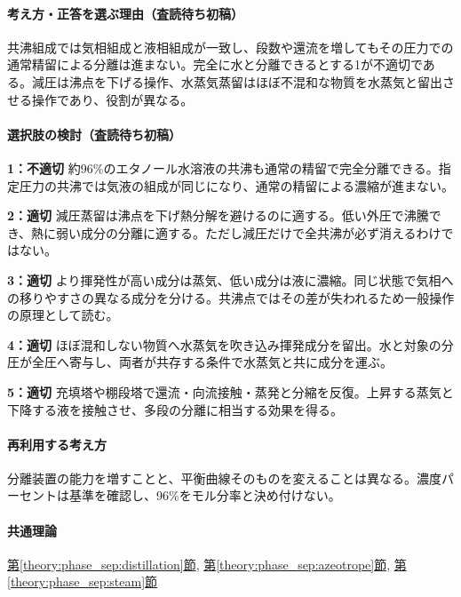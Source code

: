 \paragraph{考え方・正答を選ぶ理由（査読待ち初稿）} 共沸組成では気相組成と液相組成が一致し、段数や還流を増してもその圧力での通常精留による分離は進まない。完全に水と分離できるとする1が不適切である。減圧は沸点を下げる操作、水蒸気蒸留はほぼ不混和な物質を水蒸気と留出させる操作であり、役割が異なる。

\paragraph{選択肢の検討（査読待ち初稿）}\mbox{}\par

\noindent\textbf{1：不適切} 約96\%のエタノール水溶液の共沸も通常の精留で完全分離できる。指定圧力の共沸では気液の組成が同じになり、通常の精留による濃縮が進まない。\par

\noindent\textbf{2：適切} 減圧蒸留は沸点を下げ熱分解を避けるのに適する。低い外圧で沸騰でき、熱に弱い成分の分離に適する。ただし減圧だけで全共沸が必ず消えるわけではない。\par

\noindent\textbf{3：適切} より揮発性が高い成分は蒸気、低い成分は液に濃縮。同じ状態で気相への移りやすさの異なる成分を分ける。共沸点ではその差が失われるため一般操作の原理として読む。\par

\noindent\textbf{4：適切} ほぼ混和しない物質へ水蒸気を吹き込み揮発成分を留出。水と対象の分圧が全圧へ寄与し、両者が共存する条件で水蒸気と共に成分を運ぶ。\par

\noindent\textbf{5：適切} 充填塔や棚段塔で還流・向流接触・蒸発と分縮を反復。上昇する蒸気と下降する液を接触させ、多段の分離に相当する効果を得る。\par

\paragraph{再利用する考え方} 分離装置の能力を増すことと、平衡曲線そのものを変えることは異なる。濃度パーセントは基準を確認し、96\%をモル分率と決め付けない。

\paragraph{共通理論} \hyperref[theory:phase_sep:distillation]{第\ref*{theory:phase_sep:distillation}節}, \hyperref[theory:phase_sep:azeotrope]{第\ref*{theory:phase_sep:azeotrope}節}, \hyperref[theory:phase_sep:steam]{第\ref*{theory:phase_sep:steam}節}

